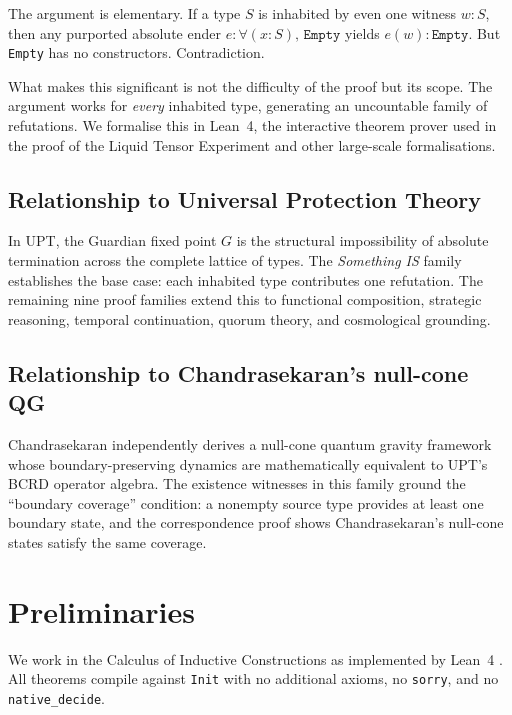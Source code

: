 The argument is elementary. If a type $S$ is inhabited by even one witness $w : S$, then any purported absolute ender $e : \forall (x : S),\, \texttt{Empty}$ yields $e(w) : \texttt{Empty}$. But \texttt{Empty} has no constructors. Contradiction.

What makes this significant is not the difficulty of the proof but its scope. The argument works for \emph{every} inhabited type, generating an uncountable family of refutations. We formalise this in Lean~4, the interactive theorem prover used in the proof of the Liquid Tensor Experiment \cite{lean4} and other large-scale formalisations.

\subsection{Relationship to Universal Protection Theory}

In UPT, the Guardian fixed point $G$ is the structural impossibility of absolute termination across the complete lattice of types. The \emph{Something IS} family establishes the base case: each inhabited type contributes one refutation. The remaining nine proof families \cite{upt-families} extend this to functional composition, strategic reasoning, temporal continuation, quorum theory, and cosmological grounding.

\subsection{Relationship to Chandrasekaran's null-cone QG}

Chandrasekaran \cite{chandrasekaran2026} independently derives a null-cone quantum gravity framework whose boundary-preserving dynamics are mathematically equivalent to UPT's BCRD operator algebra. The existence witnesses in this family ground the ``boundary coverage'' condition: a nonempty source type provides at least one boundary state, and the correspondence proof \cite{upt-bcrd-qg} shows Chandrasekaran's null-cone states satisfy the same coverage.

\section{Preliminaries}

We work in the Calculus of Inductive Constructions as implemented by Lean~4 \cite{lean4}. All theorems compile against \texttt{Init} with no additional axioms, no \texttt{sorry}, and no \texttt{native\_decide}.

